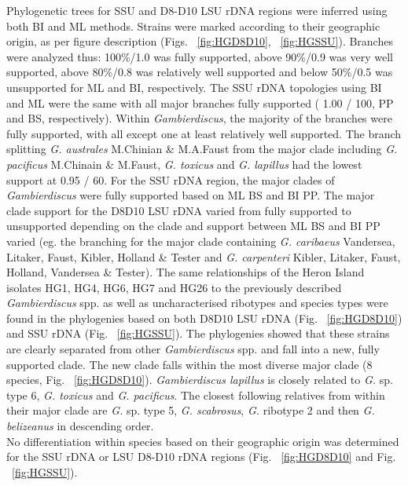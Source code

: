 \documentclass[12pt]{article}
\begin{document}
Phylogenetic trees for SSU and D8-D10 LSU rDNA regions were inferred using both BI and ML methods. 
Strains were marked according to their geographic origin, as per figure description (Figs. ~\ref{fig:HGD8D10}, ~\ref{fig:HGSSU}). 
Branches were analyzed thus: 100\%/1.0 was fully supported, above 90\%/0.9 was very well supported, above 80\%/0.8 was relatively well supported and below 50\%/0.5 was unsupported for ML and BI, respectively.
The SSU rDNA  topologies using BI and ML were the same with all major branches fully supported ( 1.00 / 100, PP and BS, respectively). 
Within \emph{Gambierdiscus}, the majority of the branches were fully supported, with all except one at least relatively well supported. 
The branch splitting \emph{G. australes} M.Chinian \& M.A.Faust from the major clade including \emph{G. pacificus} M.Chinain \&
M.Faust, \emph{G. toxicus} and \emph{G. lapillus} had the lowest support at 0.95 / 60.
For the SSU rDNA region, the major clades of \textit{Gambierdiscus} were fully supported based on ML BS and BI PP. 
The major clade support for the D8D10 LSU rDNA varied from fully supported to unsupported depending on the clade and support between ML BS and BI PP varied (eg. the branching for the major clade containing \emph{G. caribaeus} Vandersea, Litaker, Faust, Kibler, Holland \& Tester and \emph{G. carpenteri} Kibler, Litaker, Faust, Holland, Vandersea \& Tester). 
The same relationships of the Heron Island isolates HG1, HG4, HG6, HG7 and HG26 to the previously described \emph{Gambierdiscus} spp. as well as uncharacterised ribotypes and species types were found in the phylogenies based on both D8D10 LSU rDNA (Fig. ~\ref{fig:HGD8D10}) and SSU rDNA (Fig. ~\ref{fig:HGSSU}). 
The phylogenies showed that these strains are clearly separated from other \emph{Gambierdiscus} spp. and fall into a new, fully supported clade. 
The new clade falls within the most diverse major clade (8 species, Fig. ~\ref{fig:HGD8D10}). 
\emph{Gambierdiscus lapillus} is closely related to \emph{G.} sp. type 6, \emph{G. toxicus} and \emph{G. pacificus}. 
The closest following relatives from within their major clade are \emph{G.} sp. type 5, \emph{G. scabrosus}, \emph{G.} ribotype 2 and then \emph{G. belizeanus} in descending order. \\
No differentiation within species based on their geographic origin was determined for the SSU rDNA or LSU D8-D10 rDNA regions (Fig. ~\ref{fig:HGD8D10} and Fig. ~\ref{fig:HGSSU}).

\end{document}
